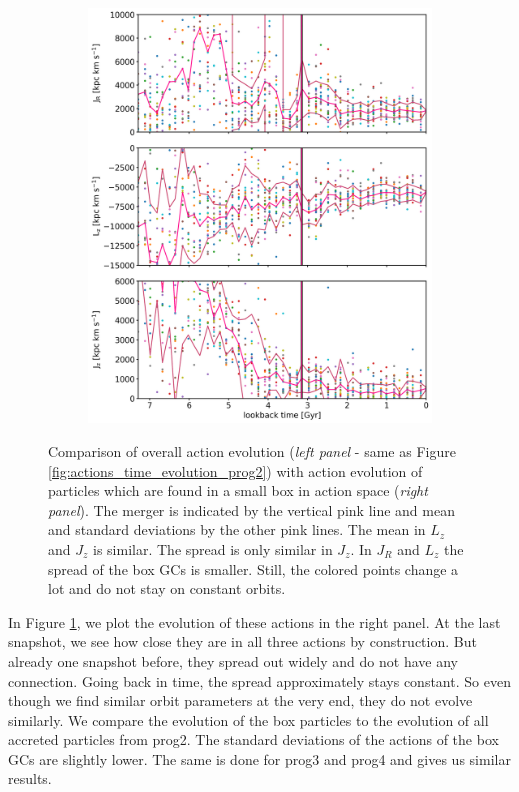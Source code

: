 \begin{figure}[htbp]
\begin{subfigure}[c]{0.48\textwidth}
	    \includegraphics[width=\textwidth]{plots/Dynamics/prog2/gcwodisk_action_time_evolution_box_hist_mean.png}
    \end{subfigure}
    \caption{Comparison of overall action evolution (\textit{left panel} - same as Figure \ref{fig:actions_time_evolution_prog2}) with action evolution of particles which are found in a small box in action space (\textit{right panel}). The merger is indicated by the vertical pink line and mean and standard deviations by the other pink lines. The mean in $L_z$ and $J_z$ is similar. The spread is only similar in $J_z$. In $J_R$ and $L_z$ the spread of the box \acp{GC} is smaller. Still, the colored points change a lot and do not stay on constant orbits. }\label{fig:comparison_actions_time_evolution_box_prog2}
\end{figure}
In Figure \ref{fig:comparison_actions_time_evolution_box_prog2}, we plot the evolution of these actions in the right panel. At the last snapshot, we see how close they are in all three actions by construction. But already one snapshot before, they spread out widely and do not have any connection. Going back in time, the spread approximately stays constant. So even though we find similar orbit parameters at the very end, they do not evolve similarly. We compare the evolution of the box particles to the evolution of all accreted particles from prog2. The standard deviations of the actions of the box \acp{GC} are slightly lower. The same is done for prog3 and prog4 and gives us similar results. \\\\
